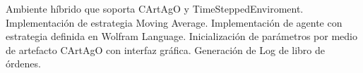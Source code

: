 \markdownRendererInterblockSeparator
{}\markdownRendererUlBegin
\markdownRendererUlItem Ambiente híbrido que soporta CArtAgO y TimeSteppedEnviroment.\markdownRendererUlItemEnd 
\markdownRendererUlItem Implementación de estrategia Moving Average.\markdownRendererUlItemEnd 
\markdownRendererUlItem Implementación de agente con estrategia definida en Wolfram Language.\markdownRendererUlItemEnd 
\markdownRendererUlItem Inicialización de parámetros por medio de artefacto CArtAgO con interfaz gráfica.\markdownRendererUlItemEnd 
\markdownRendererUlItem Generación de Log de libro de órdenes.\markdownRendererUlItemEnd 
\markdownRendererUlEnd \markdownRendererInterblockSeparator
{}\markdownRendererHorizontalRule{}\relax